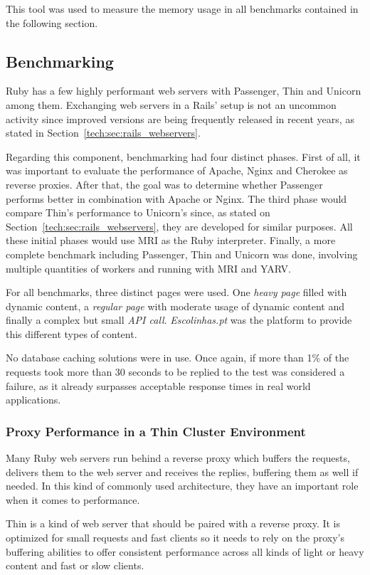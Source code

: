 This tool was used to measure the memory usage in all benchmarks contained in the following section.

\subsection{Benchmarking}
Ruby has a few highly performant web servers with Passenger, Thin and Unicorn among them. Exchanging web servers in a Rails' setup is not an uncommon activity since improved versions are being frequently released in recent years, as stated in Section~\ref{tech:sec:rails_webservers}.

Regarding this component, benchmarking had four distinct phases. First of all, it was important to evaluate the performance of Apache, Nginx and Cherokee as reverse proxies. After that, the goal was to determine whether Passenger performs better in combination with Apache or Nginx. The third phase would compare Thin's performance to Unicorn's since, as stated on Section~\ref{tech:sec:rails_webservers}, they are developed for similar purposes. All these initial phases would use MRI as the Ruby interpreter. Finally, a more complete benchmark including Passenger, Thin and Unicorn was done, involving multiple quantities of workers and running with MRI and YARV.

For all benchmarks, three distinct pages were used. One \textit{heavy page} filled with dynamic content, a \textit{regular page} with moderate usage of dynamic content and finally a complex but small \textit{API call}. \textit{Escolinhas.pt} was the platform to provide this different types of content.

No database caching solutions were in use. Once again, if more than 1\% of the requests took more than 30 seconds to be replied to the test was considered a failure, as it already surpasses acceptable response times in real world applications. %

\subsubsection{Proxy Performance in a Thin Cluster Environment}
Many Ruby web servers run behind a reverse proxy which buffers the requests, delivers them to the web server and receives the replies, buffering them as well if needed. In this kind of commonly used architecture, they have an important role when it comes to performance.

Thin is a kind of web server that should be paired with a reverse proxy. It is optimized for small requests and fast clients so it needs to rely on the proxy's buffering abilities to offer consistent performance across all kinds of light or heavy content and fast or slow clients.

